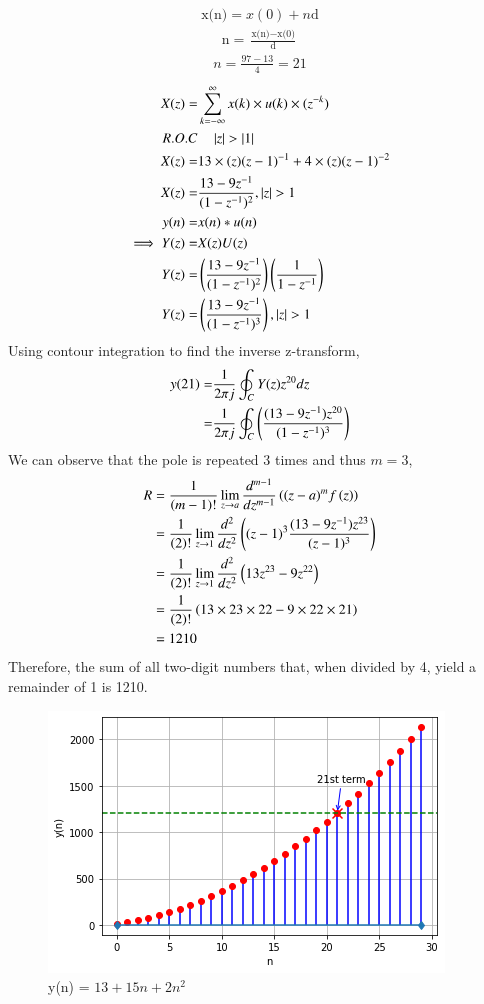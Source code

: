 \documentclass[journal,12pt,twocolumn]{IEEEtran}
\theoremstyle{remark}
\begin{document}
  \begin{align}
      \text{x(n)}=x(0)+n{\text{d}}
  \end{align}
  \begin{align}
    \text{n} = \frac{\text{x(n)} - \text{x(0)}}{\text{d}} 
  \end{align}
  \begin{align}
      n=\frac{97-13}{4}=21
  \end{align}
\begin{align}
X(z)=&\sum\limits^{\infty}_{k=-\infty}{x(k)\times u(k)\times(z^{-k}})\\
R.O.C&\quad\abs{z}>\abs{1}\\
X(z)=&13\times (z)(z-1)^{-1}+4\times(z)(z-1)^{-2}\\
X(z)=&\frac{13-9z^{-1}}{(1-z^{-1})^2},|z|>1\\
y(n)=&x(n)*u(n)\\\implies Y(z)=&X(z)U(z)\\Y(z)=&\brak{\frac{13-9z^{-1}}{(1-z^{-1})^2}} \brak{\frac{1}{1-z^{-1}}}\\Y(z)=&\brak{\frac{13-9z^{-1}}{(1-z^{-1})^{3}}},|z|>1
\end{align}
Using contour integration to find the inverse z-transform,
\begin{align}
    y(21)=&\frac{1}{2\pi j}\oint_{C}Y(z) z^{20} dz  \\=&\frac{1}{2\pi j}\oint_{C}\left(\frac{(13-9z^{-1})z^{20}}{(1-z^{-1})^{3}}\right)
\end{align}
We can observe that the pole is repeated $3$ times and thus $m=3$,
\begin{align}
    R&=\frac{1}{\left(m-1\right)!}\lim\limits_{z\to a}\frac{d^{m-1}}{dz^{m-1}}\left({(z-a)}^{m}f\left(z\right)\right)  \\&=\frac{1}{\left(2\right)!}\lim\limits_{z\to 1}\frac{d^{2}}{dz^{2}}\left({(z-1)}^{3}\frac{(13-9z^{-1})z^{23}}{(z-1)^{3}}\right)\\&=\frac{1}{\left(2\right)!}\lim\limits_{z\to 1}\frac{d^{2}}{dz^{2}}\left(13z^{23}-9z^{22}\right)\\&=\frac{1}{\left(2\right)!}\left(13\times 23\times 22-9\times 22\times21\right)\\&=1210
\end{align}
Therefore, the sum of all two-digit numbers that, when divided by 4, yield a remainder of 1 is 1210.\\
\begin{figure}[h]
  \centering
  \includegraphics[width=\columnwidth]{Graph/plot1.png}
  \caption{y(n) = $13 + 15n+2n^2$}
  \label{fig:graph}
\end{figure}
\end{document}
